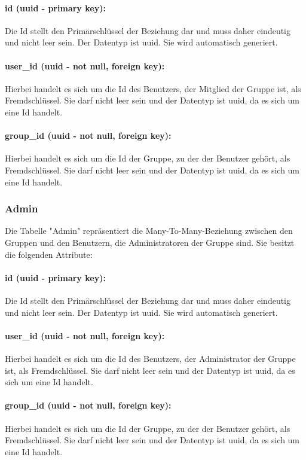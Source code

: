 \documentclass{entwurfsheft}
\begin{document}
\paragraph{id (uuid - primary key):} Die Id stellt den Primärschlüssel der Beziehung dar und muss daher eindeutig und nicht leer sein. Der Datentyp ist \Gls{uuid}. Sie wird automatisch generiert.
\paragraph{user\_id (uuid - not null, foreign key):} Hierbei handelt es sich um die Id des Benutzers, der Mitglied der Gruppe ist, als Fremdschlüssel. Sie darf nicht leer sein und der Datentyp ist \Gls{uuid}, da es sich um eine Id handelt.
\paragraph{group\_id (uuid - not null, foreign key):} Hierbei handelt es sich um die Id der Gruppe, zu der der Benutzer gehört, als Fremdschlüssel. Sie darf nicht leer sein und der Datentyp ist \Gls{uuid}, da es sich um eine Id handelt.
\newpage
\subsubsection{Admin}
Die Tabelle "Admin" repräsentiert die Many-To-Many-Beziehung zwischen den Gruppen und den Benutzern, die Administratoren der Gruppe sind. Sie besitzt die folgenden Attribute:
\paragraph{id (uuid - primary key):} Die Id stellt den Primärschlüssel der Beziehung dar und muss daher eindeutig und nicht leer sein. Der Datentyp ist \Gls{uuid}. Sie wird automatisch generiert.
\paragraph{user\_id (uuid - not null, foreign key):} Hierbei handelt es sich um die Id des Benutzers, der Administrator der Gruppe ist, als Fremdschlüssel. Sie darf nicht leer sein und der Datentyp ist \Gls{uuid}, da es sich um eine Id handelt.
\paragraph{group\_id (uuid - not null, foreign key):} Hierbei handelt es sich um die Id der Gruppe, zu der der Benutzer gehört, als Fremdschlüssel. Sie darf nicht leer sein und der Datentyp ist \Gls{uuid}, da es sich um eine Id handelt.
\newpage
\end{document}
